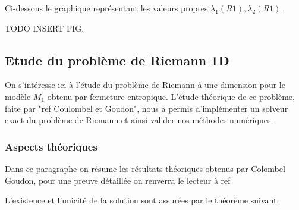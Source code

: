 






Ci-dessous le graphique représentant les valeurs propres $\lambda_1(R1), \lambda_2(R1)$.

TODO INSERT FIG.

\subsection{Etude du problème de Riemann 1D}
On s'intéresse ici à l'étude du problème de Riemann à une 
dimension pour le modèle $M_1$ obtenu par fermeture entropique. 
L'étude théorique de ce problème, faite par "ref Coulombel et Goudon", 
nous a permis d'implémenter un solveur exact du problème de Riemann et ainsi
valider nos méthodes numériques.

\subsubsection*{Aspects théoriques}

Dans ce paragraphe on résume les résultats théoriques obtenus par Colombel
Goudon, pour une preuve détaillée on renverra le lecteur à ref 

L'existence et l'unicité de la solution sont assurées par le théorème suivant,

